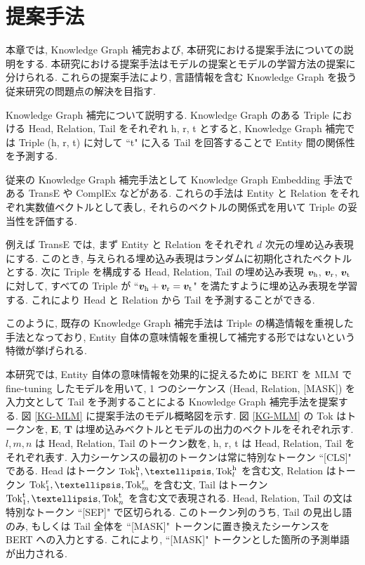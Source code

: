 \newpage
\changeindent{0cm}
\section{提案手法}
\changeindent{2cm}

本章では, Knowledge Graph 補完および, 本研究における提案手法についての説明をする. 本研究における提案手法はモデルの提案とモデルの学習方法の提案に分けられる. これらの提案手法により, 言語情報を含む Knowledge Graph を扱う従来研究の問題点の解決を目指す. \par
Knowledge Graph 補完について説明する. Knowledge Graph のある Triple における Head, Relation, Tail をそれぞれ h, r, t とすると, Knowledge Graph 補完では Triple (h, r, t) に対して ``t" に入る Tail を回答することで Entity 間の関係性を予測する. \par
従来の Knowledge Graph 補完手法として Knowledge Graph Embedding 手法である TransE \cite{TransE_WN18} や ComplEx \cite{ComplEx} などがある. これらの手法は Entity と Relation をそれぞれ実数値ベクトルとして表し, それらのベクトルの関係式を用いて Triple の妥当性を評価する. \par
例えば TransE では, まず Entity と Relation をそれぞれ $d$ 次元の埋め込み表現にする. このとき, 与えられる埋め込み表現はランダムに初期化されたベクトルとする. 次に Triple を構成する Head, Relation, Tail の埋め込み表現 $\bm{v}_{\rm h}$, $\bm{v}_{\rm r}$, $\bm{v}_{\rm t}$ に対して, すべての Triple が ``$\bm{v}_{\rm h} + \bm{v}_{\rm r} = \bm{v}_{\rm t}$" を満たすように埋め込み表現を学習する. これにより Head と Relation から Tail を予測することができる. \par
このように, 既存の Knowledge Graph 補完手法は Triple の構造情報を重視した手法となっており, Entity 自体の意味情報を重視して補完する形ではないという特徴が挙げられる. \par
本研究では, Entity 自体の意味情報を効果的に捉えるために BERT を MLM で fine-tuning したモデルを用いて, 1 つのシーケンス (Head, Relation, [MASK]) を入力文として Tail を予測することによる Knowledge Graph 補完手法を提案する. 図 \ref{KG-MLM} に提案手法のモデル概略図を示す. 図 \ref{KG-MLM} の Tok はトークンを, $\bm{E}$, $\bm{T}$ は埋め込みベクトルとモデルの出力のベクトルをそれぞれ示す. $l, m, n$ は Head, Relation, Tail のトークン数を, h, r, t は Head, Relation, Tail をそれぞれ表す. 入力シーケンスの最初のトークンは常に特別なトークン ``[CLS]" である. Head はトークン ${\rm Tok}_{1}^{\rm h}, …,{\rm Tok}_{l}^{\rm h}$ を含む文, Relation はトークン ${\rm Tok}_{1}^{\rm r}, …,{\rm Tok}_{m}^{\rm r}$ を含む文, Tail はトークン ${\rm Tok}_{1}^{\rm t}, …,{\rm Tok}_{n}^{\rm t}$ を含む文で表現される. Head, Relation, Tail の文は特別なトークン ``[SEP]" で区切られる. このトークン列のうち, Tail の見出し語のみ, もしくは Tail 全体を ``[MASK]" トークンに置き換えたシーケンスを BERT への入力とする. これにより, ``[MASK]" トークンとした箇所の予測単語が出力される. \par

